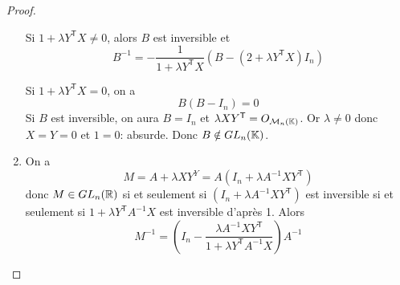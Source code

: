 \documentclass[12pt]{article}
\begin{document}
\begin{proof}
\begin{enumerate}
        Si $1+\lambda Y^{\mathsf{T}}X\neq0$, alors $B$ est inversible et 
        \begin{equation}
            \boxed{B^{-1}=-\frac{1}{1+\lambda Y^{\mathsf{T}}X}\left(B-\left(2+\lambda Y^{\mathsf{T}}X\right)I_{n}\right)}
        \end{equation}

        Si $1+\lambda Y^{\mathsf{T}}X=0$, on a 
        \begin{equation}
            B\left(B-I_{n}\right)=0
        \end{equation}
        Si $B$ est inversible, on aura $B=I_{n}$ et $\lambda XY^{\mathsf{T}}=O_{\mathcal{M}_{n}(\mathbb{K})}$. Or $\lambda\neq0$ donc $X=Y=0$ et $1=0$: absurde. Donc $B\notin GL_{n}(\mathbb{K})$.

        \item On a 
        \begin{equation}
            M=A+\lambda XY^{Y}=A\left(I_{n}+\lambda A^{-1}XY^{\mathsf{T}}\right)
        \end{equation}
        donc $M\in GL_{n}(\mathbb{R})$ si et seulement si $\left(I_{n}+\lambda A^{-1}XY^{\mathsf{T}}\right)$ est inversible si et seulement si $1+\lambda Y^{\mathsf{T}}A^{-1}X$ est inversible d'après 1. Alors 
        \begin{equation}
            \boxed{M^{-1}=\left(I_{n}-\frac{\lambda A^{-1}XY^{\mathsf{T}}}{1+\lambda Y^{\mathsf{T}}A^{-1}X}\right)A^{-1}}
        \end{equation}
    \end{enumerate}
\end{proof}
\end{document}
